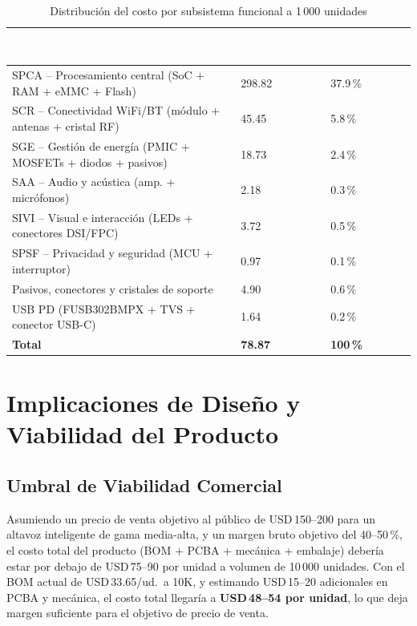 \begin{table}[H]
  \centering
  \caption{Distribución del costo por subsistema funcional a 1\,000 unidades}
  \label{tab:cost_sub_func}
  \begin{tabular}{L{4.5cm} R{2.2cm} R{2.2cm}}
    \toprule
    \textcolor{white}{\textbf{Subsistema}} &
    \textcolor{white}{\textbf{Costo/ud. (USD)}} &
    \textcolor{white}{\textbf{Participación}} \\
    \midrule
    SPCA -- Procesamiento central (SoC + RAM + eMMC + Flash) & 298.82 & 37.9\,\% \\
    SCR -- Conectividad WiFi/BT (módulo + antenas + cristal RF) & 45.45 & 5.8\,\% \\
    SGE -- Gestión de energía (PMIC + MOSFETs + diodos + pasivos) & 18.73 & 2.4\,\% \\
    SAA -- Audio y acústica (amp. + micrófonos) & 2.18 & 0.3\,\% \\
    SIVI -- Visual e interacción (LEDs + conectores DSI/FPC) & 3.72 & 0.5\,\% \\
    SPSF -- Privacidad y seguridad (MCU + interruptor) & 0.97 & 0.1\,\% \\
    Pasivos, conectores y cristales de soporte & 4.90 & 0.6\,\% \\
    USB PD (FUSB302BMPX + TVS + conector USB-C) & 1.64 & 0.2\,\% \\
    \midrule
    \textbf{Total} & \textbf{78.87} & \textbf{100\,\%} \\
    \bottomrule
  \end{tabular}
\end{table}

\section{Implicaciones de Diseño y Viabilidad del Producto}
\label{sec:cost_implicaciones}

\subsection{Umbral de Viabilidad Comercial}

Asumiendo un precio de venta objetivo al público de USD\,150--200 para un
altavoz inteligente de gama media-alta, y un margen bruto objetivo del
40--50\,\%, el costo total del producto (BOM + PCBA + mecánica + embalaje)
debería estar por debajo de USD\,75--90 por unidad a volumen de 10\,000
unidades. Con el BOM actual de USD\,33.65/ud.~a 10K, y estimando
USD\,15--20 adicionales en PCBA y mecánica, el costo total llegaría a
\textbf{USD\,48--54 por unidad}, lo que deja margen suficiente para el
objetivo de precio de venta.

